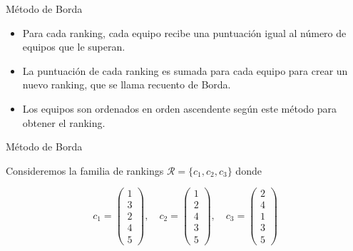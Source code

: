 \documentclass[10pt]{beamer}
\begin{document}
	\begin{frame}{Método de Borda}
		
		\begin{itemize}
			\item Para cada ranking, cada equipo recibe una puntuación igual al número de equipos que le superan.
			
			\item La puntuación de cada ranking es sumada para cada equipo para crear un nuevo ranking, que se llama recuento de Borda.
			
			\item Los equipos son ordenados en orden ascendente según este método para obtener el ranking.
		\end{itemize}
		
	\end{frame}
	
	\begin{frame}{Método de Borda}
		
		\begin{ejemplo}
			Consideremos la familia de rankings $\mathcal{R} = \{c_1, c_2, c_3\}$ donde
			
			\begin{equation*}
			c_1 = \left( \begin{array}{c}
			1\\
			3\\
			2\\
			4\\
			5
			\end{array} \right), \quad
			c_2 = \left( \begin{array}{c}
			1\\
			2\\
			4\\
			3\\
			5
			\end{array} \right), \quad
			c_3 = \left( \begin{array}{c}
			2\\
			4\\
			1\\
			3\\
			5
			\end{array} \right)
			\end{equation*}
			 
		\end{ejemplo}
	
		
	\end{frame}
	
\end{document}
